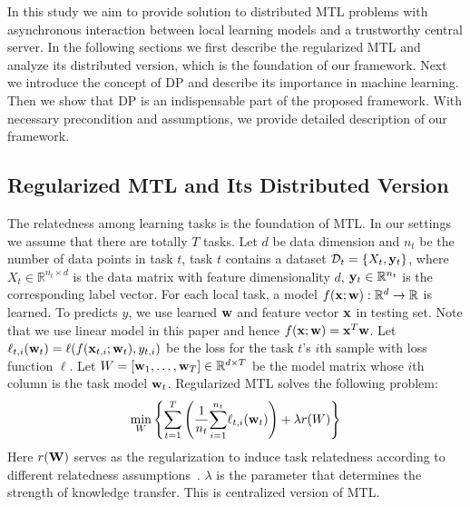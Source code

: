 
In this study we aim to provide solution to distributed MTL problems with asynchronous interaction between local learning models and a trustworthy central server. In the following sections we first describe the regularized MTL and analyze its distributed version, which is the foundation of our framework. Next we introduce the concept of DP and describe its importance in machine learning. Then we show that DP is an indispensable part of the proposed framework. With necessary precondition and assumptions, we provide detailed description of our framework.

\subsection{Regularized MTL and Its Distributed Version}

The relatedness among learning tasks is the foundation of MTL. In our settings we assume that there are totally $T$ tasks. Let $d$ be data dimension and $n_{t}$ be the number of data points in task $t$, task $t$ contains a dataset $\mathcal D_{t} = \{X_{t},\mathbf{y}_{t}\}$, where $X_{t} \in \mathbb R^{n_{t}\times d}$ is the data
matrix with feature dimensionality $d$, $\mathbf{y}_{t} \in \mathbb R^{n_{t}}$ is the
corresponding label vector. For each local task, a model
$f(\mathbf{x}; \mathbf{w}): \mathbb R^{d} \rightarrow \mathbb R$ is learned. To predicts $y$, we use learned $\mathbf{w}$ and feature vector $\mathbf{x}$ in testing set. Note that we use linear model in this paper and hence $f(\mathbf{x}; \mathbf{w}) = \mathbf{x}^T\mathbf{w}$. Let
$\ell_{t,i}(\mathbf{w}_{t}) = \ell(f(\mathbf{x}_{t,i}; \mathbf{w}_{t}), y_{t,i})$ be the loss
for the task $t$'s $i$th sample with loss function $\ell$. Let $W = [\mathbf{w}_1, \dots, \mathbf{w}_T] \in \mathbb
R^{d \times T}$ be the model matrix whose $i$th column is the task model
$\mathbf{w}_{t}$. Regularized MTL solves the following problem:
\begin{align} 
\min_{W} \left\{ \displaystyle{\sum_{t=1}^T} \left(\frac{1}{n_{t}}\displaystyle{\sum_{i=1}^{n_{t}}} \ell_{t,i}(\mathbf{w}_{t})\right) + \lambda r(W) \right\}
\label{eqt:mtl}
\end{align}
Here $r(\mathbf{W})$ serves as the regularization to induce task relatedness according to different relatedness assumptions~\cite{argyriou2008convex, kim2010tree}. $\lambda$ is the parameter that determines the strength of knowledge transfer. This is centralized version of MTL.

